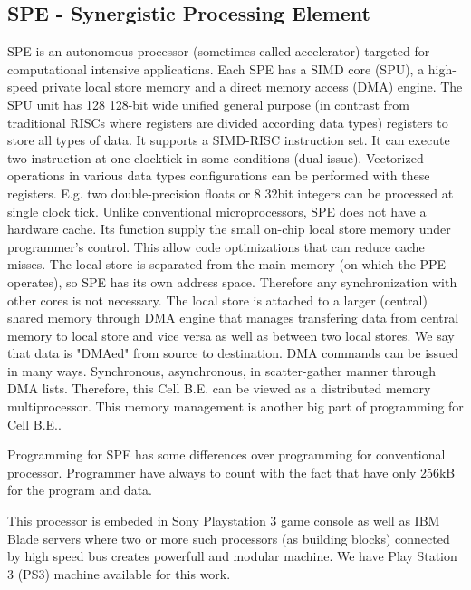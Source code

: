 \subsection{SPE - Synergistic Processing Element}
SPE is an autonomous processor (sometimes called accelerator) targeted for computational intensive applications.
Each SPE has a SIMD core (SPU), a high-speed private local store memory and a direct memory access (DMA) engine.
The SPU unit has 128 128-bit wide unified general purpose (in contrast from traditional RISCs where registers are divided according data types) registers to store all types of data.
It supports a SIMD-RISC instruction set.
It can execute two instruction at one clocktick in some conditions (dual-issue).
Vectorized operations in various data types configurations can be performed with these registers.
E.g. two double-precision floats or 8 32bit integers can be processed at single clock tick.
Unlike conventional microprocessors, SPE does not have a hardware cache.
Its function supply the small on-chip local store memory under programmer's control.
This allow code optimizations that can reduce cache misses.
The local store is separated from the main memory (on which the PPE operates), so SPE has its own address space.
Therefore any synchronization with other cores is not necessary.
The local store is attached to a larger (central) shared memory through DMA engine that manages transfering data from central memory to local store and vice versa as well as between two local stores.
We say that data is "DMAed" from source to destination.
DMA commands can be issued in many ways.
Synchronous, asynchronous, in scatter-gather manner through DMA lists.
Therefore, this Cell B.E. can be viewed as a distributed memory multiprocessor.
This memory management is another big part of programming for Cell B.E..

Programming for SPE has some differences over programming for conventional processor.
Programmer have always to count with the fact that have only 256kB for the program and data.

This processor is embeded in Sony Playstation 3 game console as well as IBM Blade servers where two or more such processors (as building blocks) connected by high speed bus creates powerfull and modular machine.
We have Play Station 3 (PS3) machine available for this work.